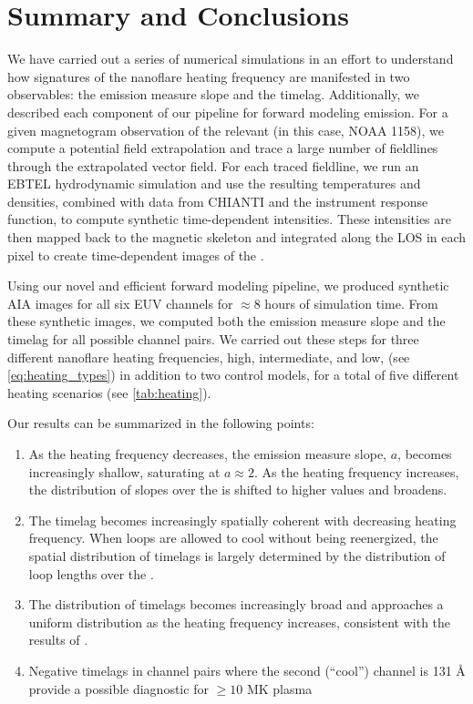\section{Summary and Conclusions}\label{conclusions}

We have carried out a series of numerical simulations in an effort to understand how signatures of the nanoflare heating frequency are manifested in two observables: the emission measure slope and the timelag. Additionally, we described each component of our pipeline for forward modeling \AR{} emission. For a given magnetogram observation of the relevant \AR{} (in this case, NOAA 1158), we compute a potential field extrapolation and trace a large number of fieldlines through the extrapolated vector field. For each traced fieldline, we run an EBTEL hydrodynamic simulation and use the resulting temperatures and densities, combined with data from CHIANTI and the instrument response function, to compute synthetic time-dependent intensities. These intensities are then mapped back to the magnetic skeleton and integrated along the LOS in each pixel to create time-dependent images of the \AR{}.

Using our novel and efficient forward modeling pipeline, we produced synthetic AIA images for all six EUV channels for $\approx8$ hours of simulation time. From these synthetic images, we computed both the emission measure slope and the timelag for all possible channel pairs. We carried out these steps for three different nanoflare heating frequencies, high, intermediate, and low, (see \autoref{eq:heating_types}) in addition to two control models, for a total of five different heating scenarios (see \autoref{tab:heating}).

Our results can be summarized in the following points:
\begin{enumerate}
    \item As the heating frequency decreases, the emission measure slope, $a$, becomes increasingly shallow, saturating at $a\approx2$. As the heating frequency increases, the distribution of slopes over the \AR{} is shifted to higher values and broadens.
    \item The timelag becomes increasingly spatially coherent with decreasing heating frequency. When loops are allowed to cool without being reenergized, the spatial distribution of timelags is largely determined by the distribution of loop lengths over the \AR{}.
    \item The distribution of timelags becomes increasingly broad and approaches a uniform distribution as the heating frequency increases, consistent with the results of \citet{viall_signatures_2016}.
    \item Negative timelags in channel pairs where the second (``cool'') channel is 131 \AA{} provide a possible diagnostic for $\ge10$ MK plasma
\end{enumerate}

